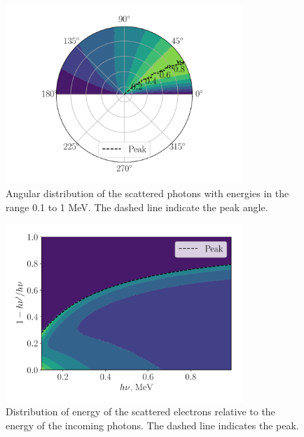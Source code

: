 \documentclass{article}
\begin{document}
\begin{figure}
\centering
\includegraphics[width=0.8\textwidth]{secondi.pdf}
\caption{Angular distribution of the scattered photons with energies in the
range 0.1 to 1 MeV. The dashed line indicate the peak angle.}
\label{fig:2i}
\end{figure}

\begin{figure}
\centering
\includegraphics[width=0.8\textwidth]{secondii.pdf}
\caption{Distribution of energy of the scattered electrons relative to the
energy of the incoming photons. The dashed line indicates the peak.}
\label{fig:2ii}
\end{figure}
\end{document}

